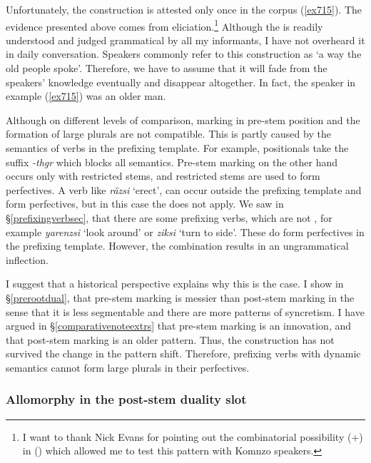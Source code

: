 Unfortunately, the  construction is attested only once in the corpus (\ref{ex715}). The evidence presented above comes from eliciation.\footnote{I want to thank Nick Evans for pointing out the combinatorial possibility (\Sg+\Du) in  (\citealt{Evans:2014bz}) which allowed me to test this pattern with Komnzo speakers.} Although the  is readily understood and judged grammatical by all my informants, I have not overheard it in daily conversation. Speakers commonly refer to this construction as `a way the old people spoke'. Therefore, we have to assume that it will fade from the speakers'  knowledge eventually and disappear altogether. In fact, the speaker in example (\ref{ex715}) was an older man.%

Although on different levels of comparison,  marking in pre-stem position and the formation of large plurals are not compatible. This is partly caused by the  semantics of verbs in the prefixing template. For example, positionals take the  suffix \emph{-thgr} which blocks all  semantics. Pre-stem  marking on the other hand occurs only with restricted stems, and restricted stems are used to form perfectives. A  verb like \emph{räzsi} `erect', can occur outside the prefixing template and form perfectives, but in this case the  does not apply. We saw in \S{}\ref{prefixingverbsec}, that there are some prefixing verbs, which are not , for example \emph{yarenzsi} `look around' or \emph{ziksi} `turn to side'. These do form perfectives in the prefixing template. However, the  combination results in an ungrammatical inflection.%

I suggest that a historical perspective explains why this is the case. I show in \S{}\ref{prerootdual}, that pre-stem  marking is messier than post-stem  marking in the sense that it is less segmentable and there are more patterns of syncretism. I have argued in \S{}\ref{comparativenoteextrs} that pre-stem  marking is an innovation, and that post-stem  marking is an older pattern. Thus, the  construction has not survived the change in the pattern shift. Therefore, prefixing verbs with dynamic semantics cannot form large plurals in their perfectives.

\subsubsection{Allomorphy in the post-stem duality slot} \label{allomorphdualsuffix}

